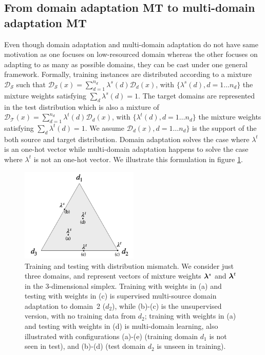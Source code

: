 \subsection{From domain adaptation MT to multi-domain adaptation MT}
Even though domain adaptation and multi-domain adaptation do not have same motivation as one focuses on low-resourced domain whereas the other focuses on adapting to as many as possible domains, they can be cast under one general framework. Formally, training instances are distributed according to a mixture $\mathcal{D_S}$ such that $\mathcal{D_S}(x) = \sum_{d=1}^{n_d} \lambda^{s}(d) \mathcal{D}_d(x)$, with $\{\lambda^{s}(d), d=1 \dots n_d\}$ the mixture weights satisfying $\sum_d \lambda^{s}(d)=1$. The target domains are represented in the test distribution which is also a mixture of $\mathcal{D_T}(x) = \sum_{d=1}^{n_d} \lambda^{t}(d) \mathcal{D}_d(x)$, with $\{\lambda^{t}(d), d=1 \dots n_d\}$ the mixture weights satisfying $\sum_d \lambda^{t}(d)=1$. We assume $\mathcal{D}_d(x), d=1 \dots n_d\}$ is the support of the both source and target distribution. Domain adaptation solves the case where $\lambda^t$ is an one-hot vector while multi-domain adaptation happens to solve the case where $\lambda^t$ is not an one-hot vector. We illustrate this formulation in figure \ref{fig:mdmt-lambdas}.
\begin{figure}[h]
  \centering
  \includegraphics[width=0.5\textwidth]{graphics/mdmt-lambdas}
  \caption[Training and testing with distribution mismatch]{Training and testing with distribution mismatch. We consider just three domains, and represent vectors of mixture weights $\bm{\lambda}^{s}$ and $\bm{\lambda}^{t}$ in the 3-dimensional simplex. Training with weights in (a) and testing with weights in (c) is supervised multi-source domain adaptation to domain~2 ($d_2$), while (b)-(c) is the unsupervised version, with no training data from $d_2$; training with weights in (a) and testing with weights in (d) is multi-domain learning, also illustrated with configurations (a)-(e) (training domain $d_1$ is not seen in test), and (b)-(d)  (test domain $d_2$ is unseen in training).}
  \label{fig:mdmt-lambdas}
\end{figure}

